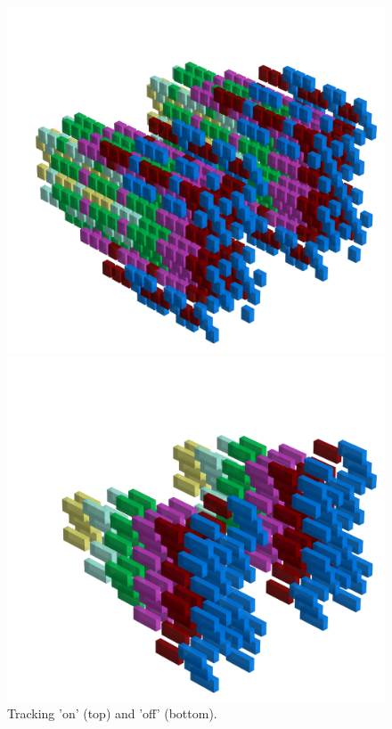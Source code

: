 \begin{figure}[H]
    \centering
    \begin{adjustbox}{width=10.5cm,center}
      \includegraphics[width=12cm]{src/tracking/pattern1-0-45.png}%
    \end{adjustbox}
    \begin{adjustbox}{width=10.5cm,margin=0cm -2cm}
      \includegraphics[width=12cm]{src/tracking/pattern1-1-45.png}%
    \end{adjustbox}
    \caption{Tracking 'on' (top) and 'off' (bottom).}
\end{figure}
\clearpage


